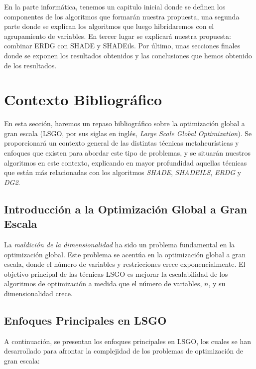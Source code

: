 En la parte informática, tenemos un capitulo inicial donde se definen los componentes de los algoritmos que formarán nuestra propuesta, una segunda parte donde se explican los algoritmos que luego hibridaremos con el agrupamiento de variables. En tercer lugar se explicará nuestra propuesta: combinar ERDG con SHADE y SHADEils. Por último, unas secciones finales donde se exponen los resultados obtenidos y las conclusiones que hemos obtenido de los resultados.

\section*{Contexto Bibliográfico}

En esta sección, haremos un repaso bibliográfico sobre la optimización global a gran escala (LSGO, por sus siglas en inglés, \textit{Large Scale Global Optimization}). Se proporcionará un contexto general de las distintas técnicas metaheurísticas y enfoques que existen para abordar este tipo de problemas, y se situarán nuestros algoritmos en este contexto, explicando en mayor profundidad aquellas técnicas que están más relacionadas con los algoritmos \textit{SHADE}, \textit{SHADEILS}, \textit{ERDG} y \textit{DG2}.

\subsection*{Introducción a la Optimización Global a Gran Escala}

La \textit{maldición de la dimensionalidad} ha sido un problema fundamental en la optimización global. Este problema se acentúa en la optimización global a gran escala, donde el número de variables y restricciones crece exponencialmente. El objetivo principal de las técnicas LSGO es mejorar la escalabilidad de los algoritmos de optimización a medida que el número de variables, \( n \), y su dimensionalidad crece.

\subsection*{Enfoques Principales en LSGO}

A continuación, se presentan los enfoques principales en LSGO, los cuales se han desarrollado para afrontar la complejidad de los problemas de optimización de gran escala:

